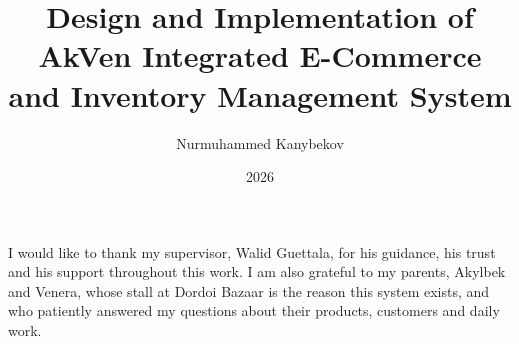 \documentclass{elteikthesis}
\title{Design and Implementation of AkVen Integrated E-Commerce and Inventory Management System}
\date{2026}
\author{Nurmuhammed Kanybekov}
\affiliation{PhD candidate, MSc}
\newif\ifaideclaration
\begin{document}

\maketitle



\ifaideclaration

\cleardoublepage
\fi


\cleardoublepage

\tableofcontents
\cleardoublepage


\cleardoublepage


\cleardoublepage


\cleardoublepage


\cleardoublepage


\cleardoublepage


\cleardoublepage

\chapter*{\acklabel}
I would like to thank my supervisor, Walid Guettala, for his guidance, his trust and his support throughout this
work. I am also grateful to my parents, Akylbek and Venera, whose stall at Dordoi Bazaar is the reason this system
exists, and who patiently answered my questions about their products, customers and daily work.

\ifaideclaration
The use of AI tools in this work is described in the Declaration on the use of AI tools at the beginning of the
thesis and in Section~\ref{sec:ai-use}.
\fi

{}
\printbibliography[title=\biblabel]
\cleardoublepage

{}
\listoffigures
\cleardoublepage

{}
\listoftables
\end{document}
